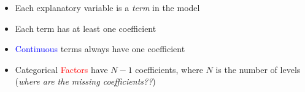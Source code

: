 \documentclass[aspectratio=43]{beamer}
\begin{document}
\begin{frame}[t]
\begin{center}


\begin{itemize}
\item Each explanatory variable is a {\it term} in the model
\item Each term has at least one coefficient
\item \textcolor{blue}{Continuous} terms always have one coefficient
\item Categorical \textcolor{red}{Factors} have $N - 1$ coefficients, where $N$ is the number of levels ({\it where are the missing coefficients??})

\end{itemize}
\end{center}
\end{frame}



\end{document}
